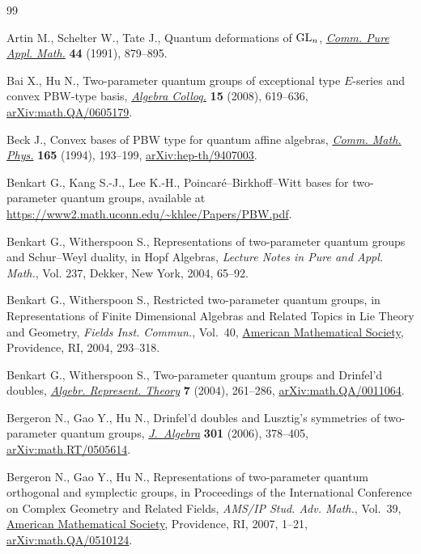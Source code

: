 \documentclass[pdftex]{sigma}
\numberwithin{equation}{section}
\begin{document}
\begin{thebibliography}{99}
\footnotesize\itemsep=0pt

Artin M., Schelter W., Tate J., Quantum deformations of {${\rm GL}_n$},
 \href{https://doi.org/10.1002/cpa.3160440804}{\textit{Comm. Pure Appl.
 Math.}} \textbf{44} (1991), 879--895.

Bai X., Hu N., Two-parameter quantum groups of exceptional type {$E$}-series
 and convex {PBW}-type basis,
 \href{https://doi.org/10.1142/S100538670800059X}{\textit{Algebra Colloq.}}
 \textbf{15} (2008), 619--636,
 \href{http://arxiv.org/abs/math.QA/0605179}{arXiv:math.QA/0605179}.

Beck J., Convex bases of {PBW} type for quantum affine algebras,
 \href{https://doi.org/10.1007/BF02099742}{\textit{Comm. Math. Phys.}}
 \textbf{165} (1994), 193--199,
 \href{http://arxiv.org/abs/hep-th/9407003}{arXiv:hep-th/9407003}.

Benkart G., Kang S.-J., Lee K.-H., Poincar\'e--{B}irkhoff--{W}itt bases for
 two-parameter quantum groups, {a}vailable at
 \url{https://www2.math.uconn.edu/~khlee/Papers/PBW.pdf}.

Benkart G., Witherspoon S., Representations of two-parameter quantum groups and
 {S}chur--{W}eyl duality, in Hopf Algebras, \textit{Lecture Notes in Pure and
 Appl. Math.}, Vol. 237, Dekker, New York, 2004, 65--92.

Benkart G., Witherspoon S., Restricted two-parameter quantum groups, in
 Representations of Finite Dimensional Algebras and Related Topics in {L}ie
 Theory and Geometry, \textit{Fields Inst. Commun.}, Vol.~40,
 \href{https://doi.org/10.1090/fic/040/15}{American Mathematical Society},
 Providence, RI, 2004, 293--318.

Benkart G., Witherspoon S., Two-parameter quantum groups and {D}rinfel'd
 doubles,
 \href{https://doi.org/10.1023/B:ALGE.0000031151.86090.2e}{\textit{Algebr.
 Represent. Theory}} \textbf{7} (2004), 261--286,
 \href{http://arxiv.org/abs/math.QA/0011064}{arXiv:math.QA/0011064}.

Bergeron N., Gao Y., Hu N., Drinfel'd doubles and {L}usztig's symmetries of
 two-parameter quantum groups,
 \href{https://doi.org/10.1016/j.jalgebra.2005.08.030}{\textit{J.~Algebra}}
 \textbf{301} (2006), 378--405,
 \href{http://arxiv.org/abs/math.RT/0505614}{arXiv:math.RT/0505614}.

Bergeron N., Gao Y., Hu N., Representations of two-parameter quantum orthogonal
 and symplectic groups, in Proceedings of the {I}nternational {C}onference on
 {C}omplex {G}eometry and {R}elated {F}ields, \textit{AMS/IP Stud. Adv.
 Math.}, Vol.~39, \href{https://doi.org/10.1090/amsip/039/01}{American
 Mathematical Society}, Providence, RI, 2007, 1--21,
 \href{http://arxiv.org/abs/math.QA/0510124}{arXiv:math.QA/0510124}.


\end{thebibliography}
\end{document}
